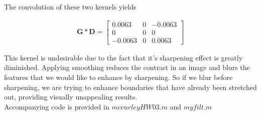 \documentclass{article}[12 pt]
\begin{document}
The convolution of these two kernels yields 

\begin{align*}
\bm{G}*\bm{D} = 
\begin{bmatrix}
    0.0063 & 0 & -0.0063 \\
    0 & 0 & 0 \\
    -0.0063 & 0 & 0.0063
\end{bmatrix}
\end{align*}

\noindent
This kernel is undesirable due to the fact that it's sharpening effect is greatly diminished.  Applying smoothing reduces the contrast in an image and blurs the features that we would like to enhance by sharpening.  So if we blur before sharpening, we are trying to enhance boundaries that have already been stretched out, providing visually unappealing results. \\



 
 \noindent 
 Accompanying code is provided in $mccurleyHW03.m$ and $myfilt.m$
\end{document}

